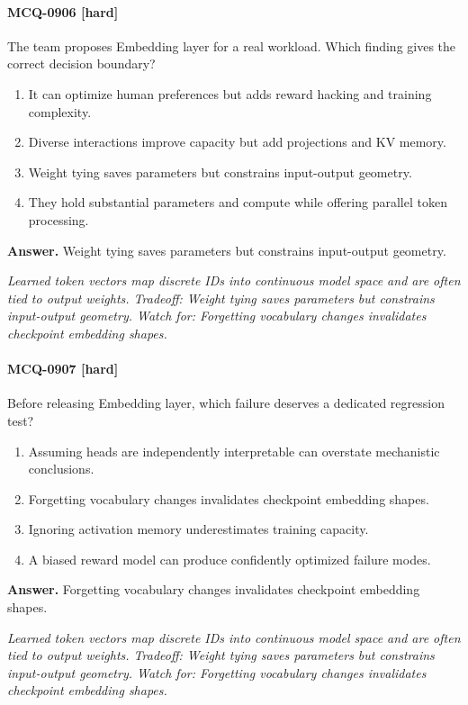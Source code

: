 \paragraph{MCQ-0906 [hard]} The team proposes Embedding layer for a real workload. Which finding gives the correct decision boundary?
\begin{enumerate}[label=\Alph*.]
\item It can optimize human preferences but adds reward hacking and training complexity.
\item Diverse interactions improve capacity but add projections and KV memory.
\item Weight tying saves parameters but constrains input-output geometry.
\item They hold substantial parameters and compute while offering parallel token processing.
\end{enumerate}
\noindent\textbf{Answer.} Weight tying saves parameters but constrains input-output geometry.
\par\textit{Learned token vectors map discrete IDs into continuous model space and are often tied to output weights. Tradeoff: Weight tying saves parameters but constrains input-output geometry. Watch for: Forgetting vocabulary changes invalidates checkpoint embedding shapes.}
\paragraph{MCQ-0907 [hard]} Before releasing Embedding layer, which failure deserves a dedicated regression test?
\begin{enumerate}[label=\Alph*.]
\item Assuming heads are independently interpretable can overstate mechanistic conclusions.
\item Forgetting vocabulary changes invalidates checkpoint embedding shapes.
\item Ignoring activation memory underestimates training capacity.
\item A biased reward model can produce confidently optimized failure modes.
\end{enumerate}
\noindent\textbf{Answer.} Forgetting vocabulary changes invalidates checkpoint embedding shapes.
\par\textit{Learned token vectors map discrete IDs into continuous model space and are often tied to output weights. Tradeoff: Weight tying saves parameters but constrains input-output geometry. Watch for: Forgetting vocabulary changes invalidates checkpoint embedding shapes.}
